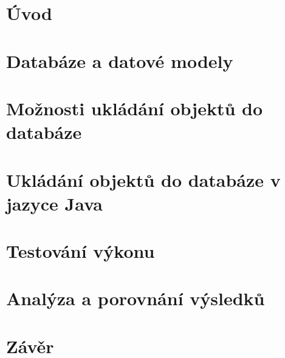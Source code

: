 \chapter{Úvod}


\chapter{Databáze a datové modely}


\chapter{Možnosti ukládání objektů do databáze}


\chapter{Ukládání objektů do databáze v jazyce Java}


\chapter{Testování výkonu}


\chapter{Analýza a porovnání výsledků}


\chapter{Závěr}

